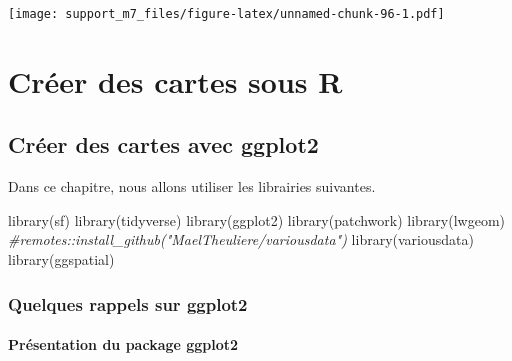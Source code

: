 \documentclass[
]{book}
\newenvironment{Shaded}{\begin{snugshade}}{\end{snugshade}}
\newcommand{\CommentTok}[1]{\textcolor[rgb]{0.56,0.35,0.01}{\textit{#1}}}
\newcommand{\FunctionTok}[1]{\textcolor[rgb]{0.00,0.00,0.00}{#1}}
\newcommand{\NormalTok}[1]{#1}
\begin{document}
\texttt{[image: support\_m7\_files/figure-latex/unnamed-chunk-96-1.pdf]}

\hypertarget{part-cruxe9er-des-cartes-sous-r}{%
\part{Créer des cartes sous R}\label{part-cruxe9er-des-cartes-sous-r}}

\hypertarget{cruxe9er-des-cartes-avec-ggplot2}{%
\chapter{Créer des cartes avec ggplot2}\label{cruxe9er-des-cartes-avec-ggplot2}}

Dans ce chapitre, nous allons utiliser les librairies suivantes.

\begin{Shaded}
\begin{Highlighting}[]
\FunctionTok{library}\NormalTok{(sf)}
\FunctionTok{library}\NormalTok{(tidyverse)}
\FunctionTok{library}\NormalTok{(ggplot2)}
\FunctionTok{library}\NormalTok{(patchwork)}
\FunctionTok{library}\NormalTok{(lwgeom)}
\CommentTok{\#remotes::install\_github("MaelTheuliere/variousdata")}
\FunctionTok{library}\NormalTok{(variousdata)}
\FunctionTok{library}\NormalTok{(ggspatial)}
\end{Highlighting}
\end{Shaded}

\hypertarget{quelques-rappels-sur-ggplot2}{%
\section{Quelques rappels sur ggplot2}\label{quelques-rappels-sur-ggplot2}}

\hypertarget{pruxe9sentation-du-package-ggplot2}{%
\subsection{Présentation du package ggplot2}\label{pruxe9sentation-du-package-ggplot2}}
\end{document}
